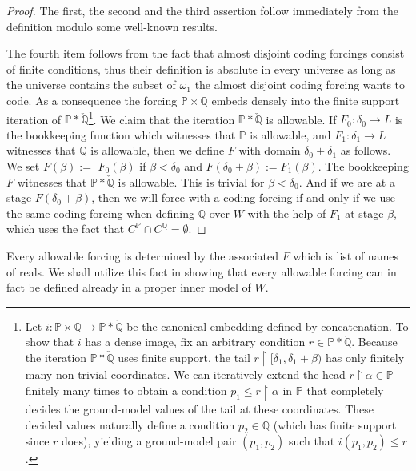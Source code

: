 \documentclass[a4paper,11pt]{article}
\newcommand{\forceP}{\mathbb{P}}
\newcommand{\forceQ}{\mathbb{Q}}
\begin{document}
\begin{proof}
The first, the second and the third assertion follow immediately from the definition modulo some well-known results.

The fourth item follows from the fact that almost disjoint coding forcings consist of finite conditions, thus their definition is absolute in every universe as long as the universe contains the subset of $\omega_1$ the almost disjoint coding forcing wants to code. As a consequence the forcing $\forceP \times \forceQ$ embeds densely into the finite support iteration of $\forceP \ast \check{\forceQ}$\footnote{
Let $i: \forceP \times \forceQ \to \forceP \ast \check{\forceQ}$ be the canonical embedding defined by concatenation. To show that $i$ has a dense image, fix an arbitrary condition $r \in \forceP \ast \check{\forceQ}$. Because the iteration $\forceP \ast \check{\forceQ}$ uses finite support, the tail $r \restriction [\delta_1, \delta_1+\beta)$ has only finitely many non-trivial coordinates. We can iteratively extend the head $r \restriction \alpha \in \forceP$ finitely many times to obtain a condition $p_1 \le r \restriction \alpha$ in $\forceP$ that completely decides the ground-model values of the tail at these coordinates. These decided values naturally define a condition $p_2 \in \forceQ$ (which has finite support since $r$ does), yielding a ground-model pair $(p_1, p_2)$ such that $i(p_1, p_2) \le r$.}. We claim that the iteration $\forceP \ast \check{\forceQ}$ is allowable. If $F_0: \delta_0 \rightarrow L$ is the bookkeeping function which witnesses that $\forceP$ is allowable, and $F_1: \delta_1 \rightarrow L$ witnesses that $\forceQ$ is allowable, then we define $F$ with domain $\delta_0 + \delta_1$ as follows. We set $F(\beta) := $ $F_0(\beta)$ if $\beta < \delta_0$ and $F(\delta_0 + \beta):= F_1 (\beta)$. The bookkeeping $F$ witnesses that $\forceP \ast \check{\forceQ}$ is allowable. This is trivial for $\beta< \delta_0$. And if we are at a stage $F(\delta_0 + \beta)$, then we will force with a coding forcing if and only if we use the same coding forcing when defining $\forceQ$ over $W$ with the help of $F_1$ at stage $\beta$, which uses the fact that  $C^{\forceP} \cap C^{\forceQ} = \emptyset$.

\end{proof}
Every allowable forcing is determined by the associated $F$ which is list of names of reals. We shall utilize this fact in showing that every allowable forcing can in fact be defined already in a proper inner model of $W$.
\end{document}
